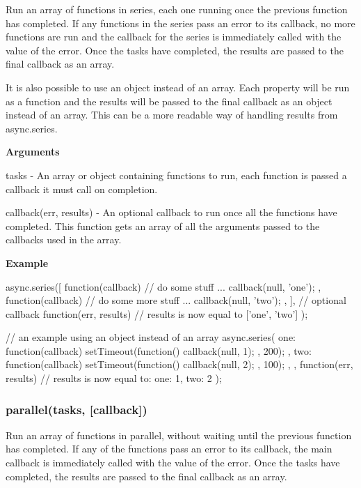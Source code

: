 Run an array of functions in series, each one running once the previous function has completed. If any functions in the series pass an error to its callback, no more functions are run and the callback for the series is immediately called with the value of the error. Once the tasks have completed, the results are passed to the final callback as an array.

It is also possible to use an object instead of an array. Each property will be run as a function and the results will be passed to the final callback as an object instead of an array. This can be a more readable way of handling results from async.\+series.

{\bfseries Arguments}


\begin{DoxyItemize}
\item tasks -\/ An array or object containing functions to run, each function is passed a callback it must call on completion.
\item callback(err, results) -\/ An optional callback to run once all the functions have completed. This function gets an array of all the arguments passed to the callbacks used in the array.
\end{DoxyItemize}

{\bfseries Example} \begin{DoxyVerb}async.series([
    function(callback){
        // do some stuff ...
        callback(null, 'one');
    },
    function(callback){
        // do some more stuff ...
        callback(null, 'two');
    },
],
// optional callback
function(err, results){
    // results is now equal to ['one', 'two']
});


// an example using an object instead of an array
async.series({
    one: function(callback){
        setTimeout(function(){
            callback(null, 1);
        }, 200);
    },
    two: function(callback){
        setTimeout(function(){
            callback(null, 2);
        }, 100);
    },
},
function(err, results) {
    // results is now equal to: {one: 1, two: 2}
});
\end{DoxyVerb}






\label{_parallel}%
 \subsubsection*{parallel(tasks, \mbox{[}callback\mbox{]})}

Run an array of functions in parallel, without waiting until the previous function has completed. If any of the functions pass an error to its callback, the main callback is immediately called with the value of the error. Once the tasks have completed, the results are passed to the final callback as an array.

